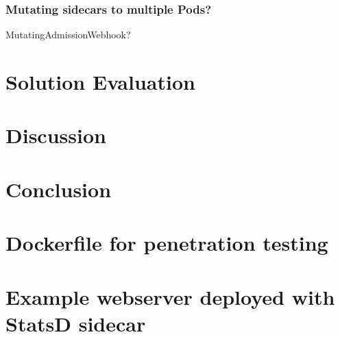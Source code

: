 \documentclass[english, 12pt, a4paper, sci, utf8, a-2b, online]{aaltothesis}
\begin{document}


\subsubsection{Mutating sidecars to multiple Pods?}

MutatingAdmissionWebhook?

\clearpage

\section{Solution Evaluation} \label{sec:solution}

\clearpage

\section{Discussion} \label{sec:discussion}

\clearpage

\section{Conclusion} \label{sec:conclusion}

\clearpage

\thesisbibliography
\printbibliography

\clearpage

\thesisappendix

\section{Dockerfile for penetration testing} \label{app:malicious-sidecar}



\clearpage

\section{Example webserver deployed with StatsD sidecar} \label{app:node-webapp}
\end{document}
